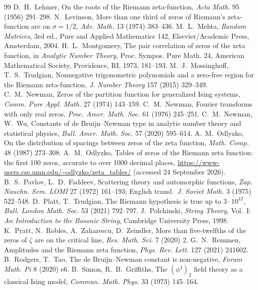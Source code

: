 \documentclass[11pt]{article}
\theoremstyle{definition}\newtheorem{definition}[theorem]{Definition}
\theoremstyle{remark}\newtheorem{remark}[theorem]{Remark}
\begin{document}
\begin{thebibliography}{99}
 D.~H.~Lehmer, On the roots of the Riemann zeta-function, \emph{Acta Math.} 95 (1956) 291--298.
 N.~Levinson, More than one third of zeros of Riemann's zeta-function are on $\sigma=1/2$, \emph{Adv. Math.} 13 (1974) 383--436.
 M.~L.~Mehta, \emph{Random Matrices}, 3rd ed., Pure and Applied Mathematics 142, Elsevier/Academic Press, Amsterdam, 2004.
 H.~L.~Montgomery, The pair correlation of zeros of the zeta function, in \emph{Analytic Number Theory}, Proc. Sympos. Pure Math. 24, American Mathematical Society, Providence, RI, 1973, 181--193.
 M.~J.~Mossinghoff, T.~S.~Trudgian, Nonnegative trigonometric polynomials and a zero-free region for the Riemann zeta-function, \emph{J. Number Theory} 157 (2015) 329--349.
 C.~M.~Newman, Zeros of the partition function for generalized Ising systems, \emph{Comm. Pure Appl. Math.} 27 (1974) 143--159.
 C.~M.~Newman, Fourier transforms with only real zeros, \emph{Proc. Amer. Math. Soc.} 61 (1976) 245--251.
 C.~M.~Newman, W.~Wu, Constants of de Bruijn--Newman type in analytic number theory and statistical physics, \emph{Bull. Amer. Math. Soc.} 57 (2020) 595--614.
 A.~M.~Odlyzko, On the distribution of spacings between zeros of the zeta function, \emph{Math. Comp.} 48 (1987) 273--308.
 A.~M.~Odlyzko, Tables of zeros of the Riemann zeta function: the first 100 zeros, accurate to over 1000 decimal places, \url{https://www-users.cse.umn.edu/~odlyzko/zeta_tables/} (accessed 24 September 2026).
 B.~S.~Pavlov, L.~D.~Faddeev, Scattering theory and automorphic functions, \emph{Zap. Nauchn. Sem. LOMI} 27 (1972) 161--193; English transl.\ \emph{J. Soviet Math.} 3 (1975) 522--548.
 D.~Platt, T.~Trudgian, The Riemann hypothesis is true up to $3\cdot10^{12}$, \emph{Bull. London Math. Soc.} 53 (2021) 792--797.
 J.~Polchinski, \emph{String Theory}, Vol.~I: \emph{An Introduction to the Bosonic String}, Cambridge University Press, 1998.
 K.~Pratt, N.~Robles, A.~Zaharescu, D.~Zeindler, More than five-twelfths of the zeros of $\zeta$ are on the critical line, \emph{Res. Math. Sci.} 7 (2020) 2.
 G.~N.~Remmen, Amplitudes and the Riemann zeta function, \emph{Phys. Rev. Lett.} 127 (2021) 241602.
 B.~Rodgers, T.~Tao, The de Bruijn--Newman constant is non-negative, \emph{Forum Math. Pi} 8 (2020) e6.
 B.~Simon, R.~B.~Griffiths, The $(\phi^4)_2$ field theory as a classical Ising model, \emph{Commun. Math. Phys.} 33 (1973) 145--164.

\end{thebibliography}
\end{document}
